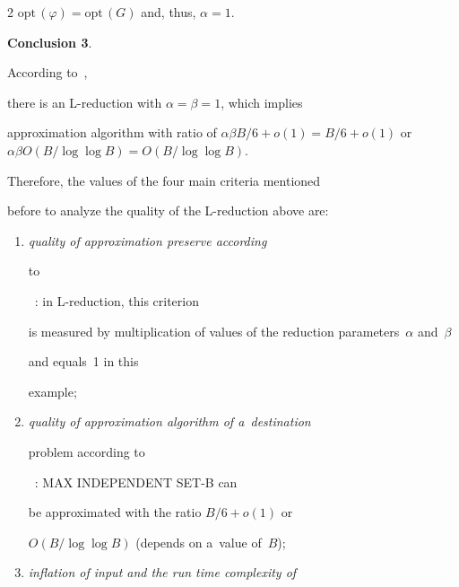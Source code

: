 \begin{multicols}{2}
$\mathrm{opt}\,(\varphi) = \mathrm{opt}\,(G)$ and, thus, $\alpha = 1$.





\smallskip





\noindent


\textbf{Conclusion 3}.


According to~\cite{MSAT3Example, P1994},


there is an \mbox{L-reduction} with $\alpha = \beta = 1$, which implies


approximation algorithm with ratio of $\alpha\beta B/6+o(1) =


B/6+o(1)$ or $\alpha\beta O({B}/{\log\log B}) =


O({B}/{\log\log B})$.





\smallskip





Therefore, the values of the four main criteria mentioned


before to analyze the quality of the L-reduction above are:\\[-13pt]


\begin{enumerate}[(1)]


\item {\it quality of approximation preserve according


to}~\cite{MSAT3Example, P1994}: in L-reduction, this criterion


is measured by multiplication of values of the reduction parameters~$\alpha$ and~$\beta$


and equals~1 in this


example;\\[-14pt]


\item {\it quality of approximation algorithm of a~destination


problem according to}~\cite{HR1994}: {MAX INDEPENDENT SET-B} can


be approximated with the ratio ${B}/{6}+o(1)$ or


$O({B}/{\log\log B})$ (depends on a~value of~$B$);\\[-14pt]


\item {\it inflation of input and the run time complexity of


}
\end{enumerate}
\end{multicols}
